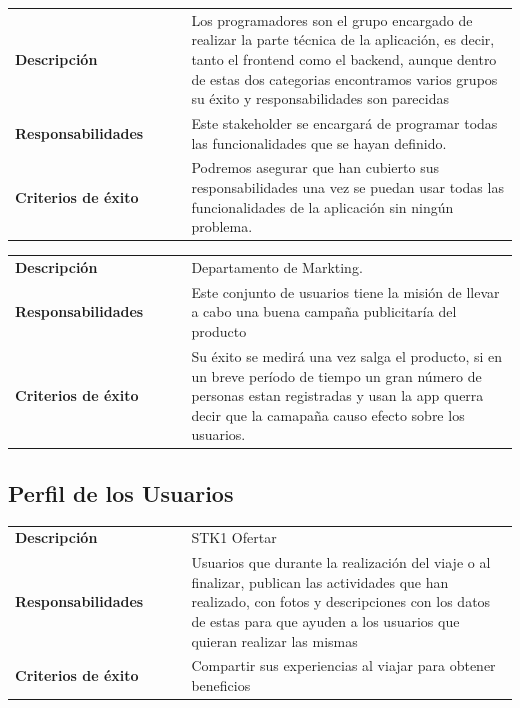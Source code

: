 \documentclass[11pt]{article}
\begin{document}
\begin{table}[H]
  \centering
  \begin{tabular}{p{0.35\linewidth}|p{0.65\linewidth}}
    \toprule
    \textbf{Descripción} & Los programadores son el grupo encargado de realizar la parte técnica de la aplicación, es decir, tanto el frontend como el backend, aunque dentro de estas dos categorias encontramos varios grupos su éxito y responsabilidades son parecidas\\ 
    \textbf{Responsabilidades} & Este stakeholder se encargará de programar todas las funcionalidades que se hayan definido. \\
    \textbf{Criterios de éxito} & Podremos asegurar que han cubierto sus responsabilidades una vez se puedan usar todas las funcionalidades de la aplicación sin ningún problema. \\
    \bottomrule
  \end{tabular}
\end{table}

\begin{table}[H]
  \centering
  \begin{tabular}{p{0.35\linewidth}|p{0.65\linewidth}}
    \toprule
    \textbf{Descripción} & Departamento de Markting.\\ 
    \textbf{Responsabilidades} & Este conjunto de usuarios tiene la misión de llevar a cabo una buena campaña publicitaría del producto \\
    \textbf{Criterios de éxito} & Su éxito se medirá una vez salga el producto, si en un breve período de tiempo un gran número de personas estan registradas y usan la app querra decir que la camapaña causo efecto sobre los usuarios. \\
    \bottomrule
  \end{tabular}
\end{table}



\subsection{Perfil de los Usuarios}
\begin{table}[H]
  \centering
  \begin{tabular}{p{0.35\linewidth}|p{0.65\linewidth}}
    \toprule
    \textbf{Descripción} & STK1 Ofertar\\
    \textbf{Responsabilidades} & Usuarios que durante la realización del viaje o al finalizar, publican las actividades que han realizado, con fotos y descripciones con los datos de estas para que ayuden a los usuarios que quieran realizar las mismas\\
    \textbf{Criterios de éxito} &  Compartir sus experiencias al viajar para obtener beneficios\\
    \bottomrule
  \end{tabular}
\end{table}
\end{document}
